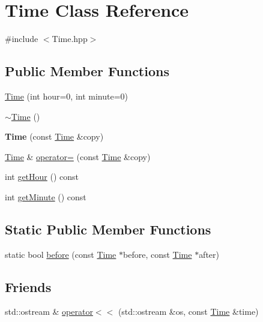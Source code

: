 \hypertarget{class_time}{}\section{Time Class Reference}
\label{class_time}


{\ttfamily \#include $<$Time.\+hpp$>$}

\subsection*{Public Member Functions}
\begin{DoxyCompactItemize}
\item 
\hyperlink{class_time_a5c382b64fa8a1573cfb9ef1cb4f9e5aa}{Time} (int hour=0, int minute=0)
\item 
\hyperlink{class_time_a1e92dbe963fa3cdd6bea207680f5f6d1}{$\sim$\+Time} ()
\item 
\hypertarget{class_time_a9668a792d8484642796140c3997fe16f}{}{\bfseries Time} (const \hyperlink{class_time}{Time} \&copy)\label{class_time_a9668a792d8484642796140c3997fe16f}

\item 
\hyperlink{class_time}{Time} \& \hyperlink{class_time_a79bbb260c87f4890c70e1f3fa233a38e}{operator=} (const \hyperlink{class_time}{Time} \&copy)
\item 
int \hyperlink{class_time_a4e9d93c2aaaac84b0a49f44184968860}{get\+Hour} () const 
\item 
int \hyperlink{class_time_a6ccac73be7aacc12410cea6b3d216357}{get\+Minute} () const 
\end{DoxyCompactItemize}
\subsection*{Static Public Member Functions}
\begin{DoxyCompactItemize}
\item 
static bool \hyperlink{class_time_a067a940f076ad7c1f29392e9ee613ccd}{before} (const \hyperlink{class_time}{Time} $\ast$before, const \hyperlink{class_time}{Time} $\ast$after)
\end{DoxyCompactItemize}
\subsection*{Friends}
\begin{DoxyCompactItemize}
\item 
std\+::ostream \& \hyperlink{class_time_aa153c7e397eda8644c840a97f6036c5b}{operator$<$$<$} (std\+::ostream \&os, const \hyperlink{class_time}{Time} \&time)
\end{DoxyCompactItemize}


